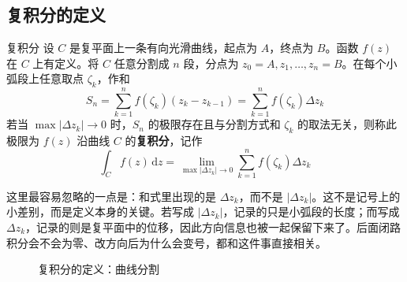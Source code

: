 \subsection{复积分的定义}

\begin{dingliyi}{复积分}{}
设 $C$ 是复平面上一条有向光滑曲线，起点为 $A$，终点为 $B$。函数 $f(z)$ 在 $C$ 上有定义。将 $C$ 任意分割成 $n$ 段，分点为 $z_0 = A, z_1, \ldots, z_n = B$。在每个小弧段上任意取点 $\zeta_k$，作和
\begin{equation}
    S_n = \sum_{k=1}^{n} f(\zeta_k)(z_k - z_{k-1}) = \sum_{k=1}^{n} f(\zeta_k)\Delta z_k
\end{equation}
若当 $\max|\Delta z_k| \to 0$ 时，$S_n$ 的极限存在且与分割方式和 $\zeta_k$ 的取法无关，则称此极限为 $f(z)$ 沿曲线 $C$ 的\textbf{复积分}，记作
\begin{equation}
    \int_C f(z)\,\mathrm{d}z = \lim_{\max|\Delta z_k| \to 0} \sum_{k=1}^{n} f(\zeta_k)\Delta z_k
\end{equation}
\end{dingliyi}

\begin{zhu}{}{}
这里最容易忽略的一点是：和式里出现的是 $\Delta z_k$，而不是 $|\Delta z_k|$。这不是记号上的小差别，而是定义本身的关键。若写成 $|\Delta z_k|$，记录的只是小弧段的长度；而写成 $\Delta z_k$，记录的则是复平面中的位移，因此方向信息也被一起保留下来了。后面闭路积分会不会为零、改方向后为什么会变号，都和这件事直接相关。
\end{zhu}

\begin{figure}[htbp]
\centering
{}
\caption{复积分的定义：曲线分割}
\label{fig:complex-int-def}
\end{figure}

